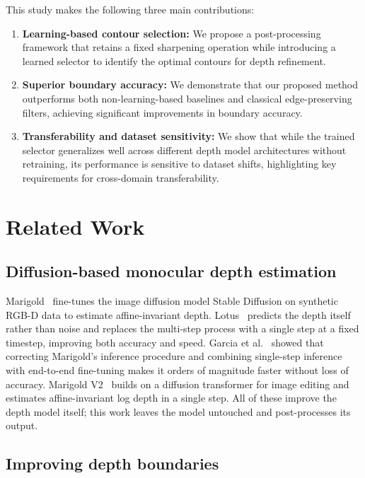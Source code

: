 \documentclass[conference]{IEEEtran}
\begin{document}
This study makes the following three main contributions:

\begin{enumerate}
\item \textbf{Learning-based contour selection:} We propose a post-processing
      framework that retains a fixed sharpening operation while introducing a
      learned selector to identify the optimal contours for depth refinement.
\item \textbf{Superior boundary accuracy:} We demonstrate that our proposed method
      outperforms both non-learning-based baselines and classical edge-preserving
      filters, achieving significant improvements in boundary accuracy.
\item \textbf{Transferability and dataset sensitivity:} We show that while the
      trained selector generalizes well across different depth model architectures
      without retraining, its performance is sensitive to dataset shifts,
      highlighting key requirements for cross-domain transferability.
\end{enumerate}

\section{Related Work}

\subsection{Diffusion-based monocular depth estimation}

Marigold~\cite{marigold} fine-tunes the image diffusion model Stable Diffusion on
synthetic RGB-D data to estimate affine-invariant depth. Lotus~\cite{lotus}
predicts the depth itself rather than noise and replaces the multi-step process
with a single step at a fixed timestep, improving both accuracy and speed. Garcia
et al.~\cite{onestep} showed that correcting Marigold's inference procedure and
combining single-step inference with end-to-end fine-tuning makes it orders of
magnitude faster without loss of accuracy. Marigold V2~\cite{marigoldv2} builds
on a diffusion transformer for image editing and estimates affine-invariant log
depth in a single step. All of these improve the depth model itself; this work
leaves the model untouched and post-processes its output.

\subsection{Improving depth boundaries}
\end{document}
